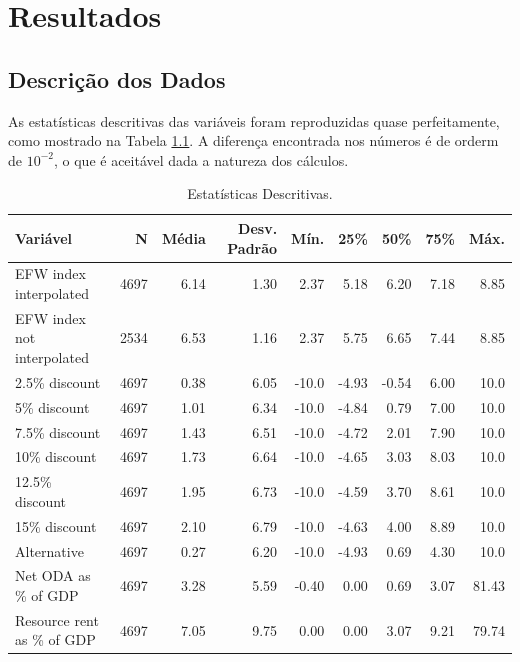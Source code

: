 \chapter{Resultados}

\section{Descrição dos Dados}
As estatísticas descritivas das variáveis foram reproduzidas quase perfeitamente, como mostrado na Tabela \ref{tab:tabela_descritiva}. A diferença encontrada nos números é de orderm de $10^{-2}$, o que é aceitável dada a natureza dos cálculos. 

\begin{table}[htbp]
    \centering
    \renewcommand{\arraystretch}{1.1}
    \captionsetup{font=small}
    \caption{Estatísticas Descritivas.}
    \label{tab:tabela_descritiva}
    \scriptsize %
    \begin{tabular}{lrrrrrrrr}
        \toprule
        \textbf{Variável} & \textbf{N} & \textbf{Média} & \textbf{Desv. Padrão} & \textbf{Mín.} & \textbf{25\%} & \textbf{50\%} & \textbf{75\%} & \textbf{Máx.} \\
        \midrule
        EFW index interpolated & 4697 & 6.14 & 1.30 & 2.37 & 5.18 & 6.20 & 7.18 & 8.85 \\
        EFW index not interpolated & 2534 & 6.53 & 1.16 & 2.37 & 5.75 & 6.65 & 7.44 & 8.85 \\
        2.5\% discount & 4697 & 0.38 & 6.05 & -10.0 & -4.93 & -0.54 & 6.00 & 10.0 \\
        5\% discount & 4697 & 1.01 & 6.34 & -10.0 & -4.84 & 0.79 & 7.00 & 10.0 \\
        7.5\% discount & 4697 & 1.43 & 6.51 & -10.0 & -4.72 & 2.01 & 7.90 & 10.0 \\
        10\% discount & 4697 & 1.73 & 6.64 & -10.0 & -4.65 & 3.03 & 8.03 & 10.0 \\
        12.5\% discount & 4697 & 1.95 & 6.73 & -10.0 & -4.59 & 3.70 & 8.61 & 10.0 \\
        15\% discount & 4697 & 2.10 & 6.79 & -10.0 & -4.63 & 4.00 & 8.89 & 10.0 \\
        Alternative & 4697 & 0.27 & 6.20 & -10.0 & -4.93 & 0.69 & 4.30 & 10.0 \\
        Net ODA as \% of GDP & 4697 & 3.28 & 5.59 & -0.40 & 0.00 & 0.69 & 3.07 & 81.43 \\
        Resource rent as \% of GDP & 4697 & 7.05 & 9.75 & 0.00 & 0.00 & 3.07 & 9.21 & 79.74 \\

\end{tabular}
\end{table}
